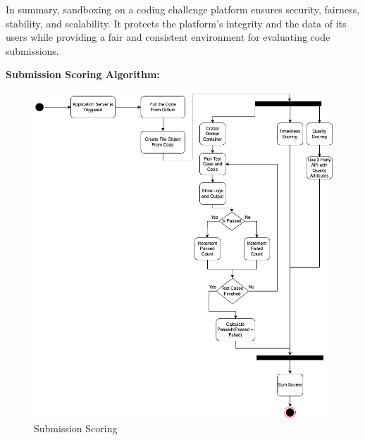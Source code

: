 In summary, sandboxing on a coding challenge platform ensures security, fairness, stability, and scalability. It protects the platform's integrity and the data of its users while providing a fair and consistent environment for evaluating code submissions.

\newpage
\textbf{Submission Scoring  Algorithm:}
\begin{figure}[H]
    \centering
    \includegraphics[width=\linewidth]{Images/DD-Sandbox.drawio.png}
    \caption{Submission Scoring}
\end{figure}




